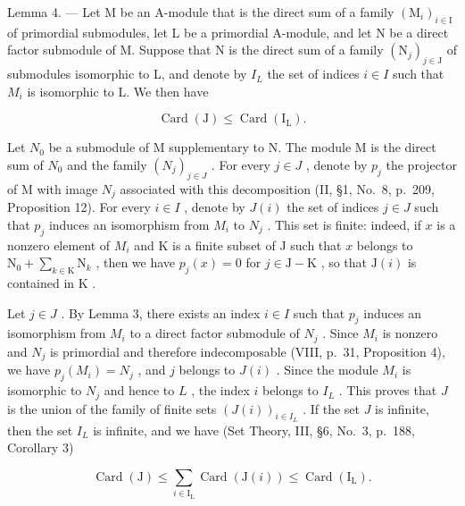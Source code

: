 Lemma 4. --- Let M be an A-module that is the direct sum of a family \((\mathrm{M}_{i})_{i\in\mathrm{I}}\) of primordial submodules, let L be a primordial A-module, and let N be a direct factor submodule of M. Suppose that N is the direct sum of a family \((\mathrm{N}_{j})_{j\in\mathrm{J}}\) of submodules isomorphic to L, and denote by \(I_{L}\) the set of indices \(i\in I\) such that \(M_{i}\) is isomorphic to L. We then have

\[
\operatorname{Card} (\mathrm{J}) \leqslant \operatorname{Card} \left(\mathrm{I} _ {\mathrm{L}}\right).\tag{1}
\]

Let \(N_0\) be a submodule of M supplementary to N. The module M is the direct sum of \(N_0\) and the family \((N_j)_{j \in J}\) . For every \(j \in J\) , denote by \(p_j\) the projector of M with image \(N_j\) associated with this decomposition (II, §1, No.~8, p.~209, Proposition 12). For every \(i \in I\) , denote by \(J(i)\) the set of indices \(j \in J\) such that \(p_j\) induces an isomorphism from \(M_i\) to \(N_j\) . This set is finite: indeed, if \(x\) is a nonzero element of \(M_i\) and K is a finite subset of J such that \(x\) belongs to \(\mathrm{N}_0 + \sum_{k\in \mathrm{K}}\mathrm{N}_k\) , then we have \(p_j(x) = 0\) for \(j\in \mathrm{J} - \mathrm{K}\) , so that \(\mathrm{J}(i)\) is contained in \(\mathrm{K}\) .

Let \(j \in J\) . By Lemma 3, there exists an index \(i \in I\) such that \(p_j\) induces an isomorphism from \(M_i\) to a direct factor submodule of \(N_j\) . Since \(M_i\) is nonzero and \(N_j\) is primordial and therefore indecomposable (VIII, p.~31, Proposition 4), we have \(p_j(M_i) = N_j\) , and \(j\) belongs to \(J(i)\) . Since the module \(M_i\) is isomorphic to \(N_j\) and hence to \(L\) , the index \(i\) belongs to \(I_L\) . This proves that \(J\) is the union of the family of finite sets \((J(i))_{i \in I_L}\) . If the set \(J\) is infinite, then the set \(I_L\) is infinite, and we have (Set Theory, III, §6, No.~3, p.~188, Corollary 3)

\[
\operatorname{Card} (\mathrm{J}) \leqslant \sum_ {i \in \mathrm{I} _ {\mathrm{L}}} \operatorname{Card} (\mathrm{J} (i)) \leqslant \operatorname{Card} (\mathrm{I} _ {\mathrm{L}}).
\]

